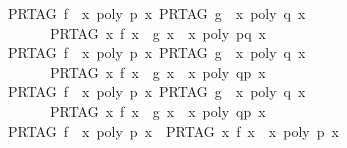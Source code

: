 \begin{isabellebody}
\ \ {\isachardoublequoteopen}{\isasymlbrakk}PR{\isacharunderscore}TAG\ f\ {\isacharequal}\ {\isacharparenleft}{\isasymlambda}x{\isachardot}\ poly\ p\ x{\isacharparenright}{\isacharsemicolon}\ PR{\isacharunderscore}TAG\ g\ {\isacharequal}\ {\isacharparenleft}{\isasymlambda}x{\isachardot}\ poly\ q\ x{\isacharparenright}{\isasymrbrakk}\isanewline
\ \ \ \ \ \ \ {\isasymLongrightarrow}\ PR{\isacharunderscore}TAG\ {\isacharparenleft}{\isasymlambda}x{\isachardot}\ f\ x\ {\isasymnoteq}\ g\ x{\isacharparenright}\ {\isacharequal}\ {\isacharparenleft}{\isasymlambda}x{\isachardot}\ poly\ {\isacharparenleft}p{\isacharminus}q{\isacharparenright}\ x\ {\isasymnoteq}\ {}{\isacharparenright}{\isachardoublequoteclose}\isanewline
\ \ {\isachardoublequoteopen}{\isasymlbrakk}PR{\isacharunderscore}TAG\ f\ {\isacharequal}\ {\isacharparenleft}{\isasymlambda}x{\isachardot}\ poly\ p\ x{\isacharparenright}{\isacharsemicolon}\ PR{\isacharunderscore}TAG\ g\ {\isacharequal}\ {\isacharparenleft}{\isasymlambda}x{\isachardot}\ poly\ q\ x{\isacharparenright}{\isasymrbrakk}\isanewline
\ \ \ \ \ \ \ {\isasymLongrightarrow}\ PR{\isacharunderscore}TAG\ {\isacharparenleft}{\isasymlambda}x{\isachardot}\ f\ x\ {\isacharless}\ g\ x{\isacharparenright}\ {\isacharequal}\ {\isacharparenleft}{\isasymlambda}x{\isachardot}\ poly\ {\isacharparenleft}q{\isacharminus}p{\isacharparenright}\ x\ {\isachargreater}\ {}{\isacharparenright}{\isachardoublequoteclose}\isanewline
\ \ {\isachardoublequoteopen}{\isasymlbrakk}PR{\isacharunderscore}TAG\ f\ {\isacharequal}\ {\isacharparenleft}{\isasymlambda}x{\isachardot}\ poly\ p\ x{\isacharparenright}{\isacharsemicolon}\ PR{\isacharunderscore}TAG\ g\ {\isacharequal}\ {\isacharparenleft}{\isasymlambda}x{\isachardot}\ poly\ q\ x{\isacharparenright}{\isasymrbrakk}\isanewline
\ \ \ \ \ \ \ {\isasymLongrightarrow}\ PR{\isacharunderscore}TAG\ {\isacharparenleft}{\isasymlambda}x{\isachardot}\ f\ x\ {\isasymle}\ g\ x{\isacharparenright}\ {\isacharequal}\ {\isacharparenleft}{\isasymlambda}x{\isachardot}\ poly\ {\isacharparenleft}q{\isacharminus}p{\isacharparenright}\ x\ {\isasymge}\ {}{\isacharparenright}{\isachardoublequoteclose}\isanewline
\isanewline
\ \ {\isachardoublequoteopen}PR{\isacharunderscore}TAG\ f\ {\isacharequal}\ {\isacharparenleft}{\isasymlambda}x{\isachardot}\ poly\ p\ x{\isacharparenright}\ {\isasymLongrightarrow}\ PR{\isacharunderscore}TAG\ {\isacharparenleft}{\isasymlambda}x{\isachardot}\ {\isacharminus}f\ x{\isacharparenright}\ {\isacharequal}\ {\isacharparenleft}{\isasymlambda}x{\isachardot}\ poly\ {\isacharparenleft}{\isacharminus}p{\isacharparenright}\ x{\isacharparenright}{\isachardoublequoteclose}\isanewline

\end{isabellebody}

